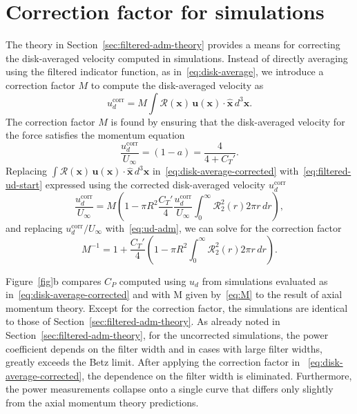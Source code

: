 \documentclass{article}
\begin{document}
\section{Correction factor for simulations}
\label{sec:correction}
The theory in Section~\ref{sec:filtered-adm-theory} provides a means for correcting the disk-averaged velocity computed in simulations. Instead of directly averaging using the filtered indicator function, as in~\eqref{eq:disk-average}, we introduce a correction factor $M$ to compute the disk-averaged velocity as
\begin{equation}
\label{eq:disk-average-corrected}
u_d^\text{corr} = M \int \mathcal{R}(\mathbf{x}) \, \mathbf{u}(\mathbf{x}) \cdot \mathbf{\hat{x}} \, d^3\mathbf{x}.
\end{equation}
The correction factor $M$ is found by ensuring that the disk-averaged velocity for the force satisfies the momentum equation
\begin{equation}
\label{eq:ud-adm}
\frac{u_d^\text{corr}}{U_\infty} = (1-a) =  \frac{4}{4+C_T'}.
\end{equation}
Replacing $\int \! \mathcal{R}(\mathbf{x}) \, \mathbf{u}(\mathbf{x}) \cdot \mathbf{\hat{x}} \, d^3\mathbf{x}$ in~\eqref{eq:disk-average-corrected} with~\eqref{eq:filtered-ud-start} expressed using the corrected disk-averaged velocity $u_d^\text{corr}$
\begin{equation}
\frac{u_d^\text{corr}}{U_\infty} = M \left(1 -  \pi R^2 \frac{C_T'}{4} \frac{u_d^\text{corr}}{U_\infty}\int_0^\infty \mathcal{R}^2_2(r) 2 \pi r \, dr\right),
\end{equation}
and replacing $u_d^\text{corr}/U_\infty$ with~\eqref{eq:ud-adm}, we can solve for the correction factor 
\begin{equation}
\label{eq:M}
M^{-1} = 1 + \frac{C_T'}{4} \left( 1- \pi R^2 \int_0^\infty \mathcal{R}^2_2(r) 2 \pi r \, dr \right).
\end{equation}

Figure~\ref{fig}b compares $C_P$ computed using $u_d$ from simulations evaluated as in~\eqref{eq:disk-average-corrected} and with M given by~\eqref{eq:M} to the result of axial momentum theory. Except for the correction factor, the simulations are identical to those of Section~\ref{sec:filtered-adm-theory}. As already noted in Section~\ref{sec:filtered-adm-theory}, for the uncorrected simulations, the power coefficient depends on the filter width and in cases with large filter widths, greatly exceeds the Betz limit. After applying the correction factor in ~\eqref{eq:disk-average-corrected}, the dependence on the filter width is eliminated. Furthermore, the power measurements collapse onto a single curve that differs only slightly from the axial momentum theory predictions.  
\end{document}
